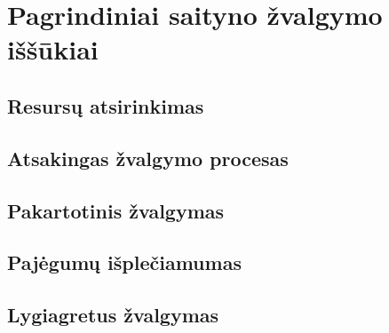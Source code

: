 \section{Pagrindiniai saityno žvalgymo iššūkiai}
\subsection{Resursų atsirinkimas}
\subsection{Atsakingas žvalgymo procesas}
\subsection{Pakartotinis žvalgymas}
\subsection{Pajėgumų išplečiamumas}
\subsection{Lygiagretus žvalgymas}

